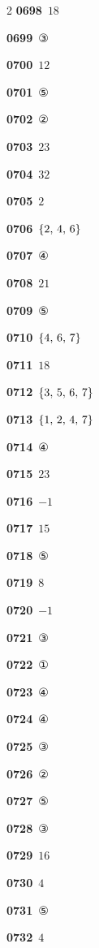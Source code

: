 \documentclass[10pt,a4paper]{article}
\begin{document}
\begin{multicols}{2}
\noindent\textbf{0698}\ $18$\par
\noindent\textbf{0699}\ ③\par
\noindent\textbf{0700}\ $12$\par
\noindent\textbf{0701}\ ⑤\par
\noindent\textbf{0702}\ ②\par
\noindent\textbf{0703}\ $23$\par
\noindent\textbf{0704}\ $32$\par
\noindent\textbf{0705}\ $2$\par
\noindent\textbf{0706}\ $\{2,\mkern3mu 4,\mkern3mu 6\}$\par
\noindent\textbf{0707}\ ④\par
\noindent\textbf{0708}\ $21$\par
\noindent\textbf{0709}\ ⑤\par
\noindent\textbf{0710}\ $\{4,\mkern3mu 6,\mkern3mu 7\}$\par
\noindent\textbf{0711}\ $18$\par
\noindent\textbf{0712}\ $\{3,\mkern3mu 5,\mkern3mu 6,\mkern3mu 7\}$\par
\noindent\textbf{0713}\ $\{1,\mkern3mu 2,\mkern3mu 4,\mkern3mu 7\}$\par
\noindent\textbf{0714}\ ④\par
\noindent\textbf{0715}\ $23$\par
\noindent\textbf{0716}\ $-1$\par
\noindent\textbf{0717}\ $15$\par
\noindent\textbf{0718}\ ⑤\par
\noindent\textbf{0719}\ $8$\par
\noindent\textbf{0720}\ $-1$\par
\noindent\textbf{0721}\ ③\par
\noindent\textbf{0722}\ ①\par
\noindent\textbf{0723}\ ④\par
\noindent\textbf{0724}\ ④\par
\noindent\textbf{0725}\ ③\par
\noindent\textbf{0726}\ ②\par
\noindent\textbf{0727}\ ⑤\par
\noindent\textbf{0728}\ ③\par
\noindent\textbf{0729}\ $16$\par
\noindent\textbf{0730}\ $4$\par
\noindent\textbf{0731}\ ⑤\par
\noindent\textbf{0732}\ $4$\par

\end{multicols}
\end{document}
